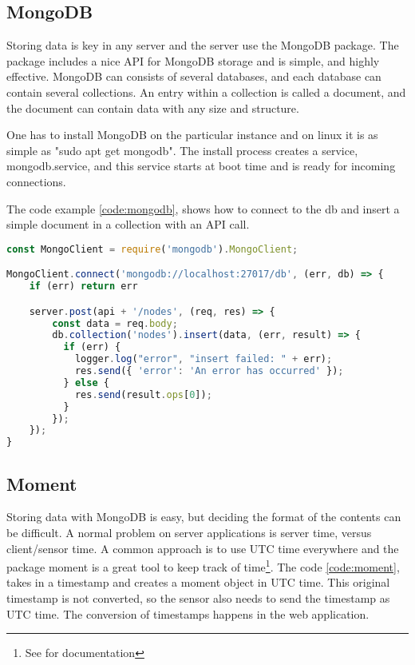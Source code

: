 \documentclass[USenglish]{ifimaster}  %
\begin{document}
\subsection{MongoDB} \label{subparagraph:mongodb}
Storing data is key in any server and the server use the MongoDB package. The package includes a nice API for MongoDB storage and is simple, and highly effective\cite{npm:mongodb}. MongoDB can consists of several databases, and each database can contain several collections. An entry within a collection is called a document, and the document can contain data with any size and structure.

One has to install MongoDB on the particular instance and on linux it is as simple as "sudo apt get mongodb". The install process creates a service, mongodb.service, and this service starts at boot time and is ready for incoming connections.

The code example \vref{code:mongodb}, shows how to connect to the db and insert a simple document in a collection with an API call.

\begin{lstlisting}[caption={MongoDB setup and insertion},label={code:mongodb},language=JavaScript]
const MongoClient = require('mongodb').MongoClient;

MongoClient.connect('mongodb://localhost:27017/db', (err, db) => {
    if (err) return err

    server.post(api + '/nodes', (req, res) => {
        const data = req.body;
        db.collection('nodes').insert(data, (err, result) => {
          if (err) {
            logger.log("error", "insert failed: " + err);
            res.send({ 'error': 'An error has occurred' });
          } else {
            res.send(result.ops[0]);
          }
        });
    });
}
\end{lstlisting}

\subsection{Moment}
Storing data with MongoDB is easy, but deciding the format of the contents can be difficult. A normal problem on server applications is server time, versus client/sensor time. A common approach is to use UTC time everywhere and the package moment is a great tool to keep track of time\footnote{See \cite{npm:moment} for documentation}. The code \vref{code:moment}, takes in a timestamp and creates a moment object in UTC time. This original timestamp is not converted, so the sensor also needs to send the timestamp as UTC time. The conversion of timestamps happens in the web application.
\end{document}
